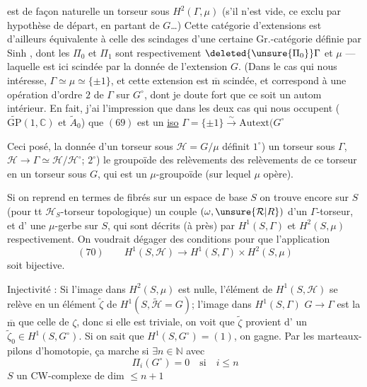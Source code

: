 est de façon naturelle un torseur sous
$H^2(\Gamma,\mu)$ (s'il n'est vide, ce  exclu
par hypothèse de départ, en partant de $G$\ldots)
Cette catégorie d'extensions est d'ailleurs équivalente
à celle des scindages d'une certaine
Gr.-catégorie définie par Sinh , dont les $\Pi_0$ et
$\Pi_1$ sont respectivement $\deleted{\unsure{\Pi_0}}\Gamma$ et $\mu$ --- laquelle
est  ici scindée par la donnée de l'extension
$G$. (Dans le cas qui nous intéresse,
$\Gamma\simeq\mu\simeq\{\pm1\}$, et
cette extension est $\overline{\mathrm m}$ scindée, et correspond
à une opération d'ordre $2$ de $\Gamma$ sur $G^\circ$,
dont je doute fort que ce soit un autom intérieur.
En fait, j'ai l'impression que dans les
deux cas qui nous occupent ($\widetilde{\mathrm{GP}}(1,\mathbb C)$ et
$\widetilde A_0$) que $(69)$ est un \uline{iso}
$\Gamma=\{\pm1\}\xrightarrow{\sim}\mathrm{Autext}(G^\circ$

Ceci posé, la donnée d'un torseur sous
$\mathcal H=G/\mu$ définit $1^\circ$) un torseur sous $\Gamma$,
$\mathcal H\longrightarrow\Gamma\simeq\mathcal H/\mathcal H^\circ$; $2^\circ$) le groupoïde des
relèvements des relèvements de ce torseur
en un torseur sous $G$, qui est un
$\mu$-groupoïde  (sur lequel $\mu$ opère).

Si on  reprend en termes de fibrés
sur un espace de base $S$ on trouve
encore sur $S$ (pour tt $\mathcal H_S$-torseur topologique)
un couple $(\omega,\unsure{\mathcal R|R})$ d'un $\Gamma$-torseur, et d'
une $\mu$-gerbe sur $S$, qui sont décrits (à 
 près) par $H^1(S,\Gamma)$ et $H^2(S,\mu)$
respectivement. On voudrait dégager des
conditions  pour que l'application
\[
(70)\qquad H^1(S,\mathcal H)\longrightarrow H^1(S,\Gamma)\times H^2(S,\mu)
\]
soit bijective.

Injectivité : Si l'image 
dans $H^2(S,\mu)$ est nulle,
l'élément de $H^1(S,\mathcal H)$ se relève en un élément $\widetilde\zeta$
de $H^1(S,\widetilde{\mathcal H}=G)$;  l'image dans $H^1(S,\Gamma)$
 $G\longrightarrow\Gamma$ est la $\overline{\mathrm m}$ que celle de $\zeta$, donc si
elle est triviale, on voit que $\widetilde\zeta$ provient d'
un $\widetilde\zeta_0\in H^1(S,G^\circ)$. Si on sait que
$H^1(S,G^\circ)=(1)$, on gagne. Par les
marteaux-pilons d'homotopie, ça marche
si $\exists n\in\mathbb N$ avec
\[
\Pi_i(G^\circ)=0\quad\text{si}\quad i\leq n
\]
$S$ un CW-complexe de dim $\leq n+1$

